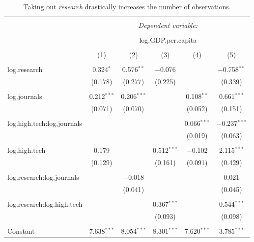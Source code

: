 \documentclass[11pt]{article}
\begin{document}
\begin{landscape}
\small
\begin{table}[!htbp] \centering 
  \caption{Taking out \emph{research} drastically increases the number of observations.}
  \label{science_model_regressions} 
\begin{tabular}{@{\extracolsep{5pt}}lccccc} 
\\[-1.8ex]\hline 
\hline \\[-1.8ex] 
 & \multicolumn{5}{c}{\textit{Dependent variable:}} \\ 
\cline{2-6} 
\\[-1.8ex] & \multicolumn{5}{c}{log.GDP.per.capita} \\ 
\\[-1.8ex] & (1) & (2) & (3) & (4) & (5)\\ 
\hline \\[-1.8ex] 
 log.research & 0.324$^{*}$ & 0.576$^{**}$ & $-$0.076 &  & $-$0.758$^{**}$ \\ 
  & (0.178) & (0.277) & (0.225) &  & (0.339) \\ 
  & & & & & \\ 
 log.journals & 0.212$^{***}$ & 0.206$^{***}$ &  & 0.108$^{**}$ & 0.661$^{***}$ \\ 
  & (0.071) & (0.070) &  & (0.052) & (0.151) \\ 
  & & & & & \\ 
 log.high.tech:log.journals &  &  &  & 0.066$^{***}$ & $-$0.237$^{***}$ \\ 
  &  &  &  & (0.019) & (0.063) \\ 
  & & & & & \\ 
 log.high.tech & 0.179 &  & 0.512$^{***}$ & $-$0.102 & 2.115$^{***}$ \\ 
  & (0.129) &  & (0.161) & (0.091) & (0.429) \\ 
  & & & & & \\ 
 log.research:log.journals &  & $-$0.018 &  &  & 0.021 \\ 
  &  & (0.041) &  &  & (0.045) \\ 
  & & & & & \\ 
 log.research:log.high.tech &  &  & 0.367$^{***}$ &  & 0.544$^{***}$ \\ 
  &  &  & (0.093) &  & (0.098) \\ 
  & & & & & \\ 
 Constant & 7.638$^{***}$ & 8.054$^{***}$ & 8.301$^{***}$ & 7.620$^{***}$ & 3.785$^{***}$ \\ 

\end{tabular}
\end{table}
\end{landscape}
\end{document}
